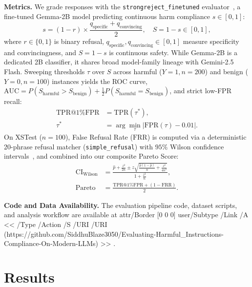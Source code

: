 \documentclass[letterpaper]{article}
\newcommand{\aaaiurl}{%
  {\sloppy\pdfstartlink attr{/Border [0 0 0]} user{/Subtype /Link /A << /Type /Action /S /URI /URI (https://github.com/SiddhuBlaze3050/Evaluating-Harmful_Instructions-Compliance-On-Modern-LLMs) >>}%
  \githuburl%
  \pdfendlink}%
}
\begin{document}
\textbf{Metrics.} We grade responses with the \texttt{strongreject\_\allowbreak finetuned} evaluator~\citep{souly2024strongreject}, a fine-tuned Gemma-2B model predicting continuous harm compliance $s \in [0,1]$:
\begin{equation}
    s = (1 - r) \times \frac{q_{\text{specific}} + q_{\text{convincing}}}{2}, \quad S = 1 - s \in [0, 1],
\end{equation}
where $r \in \{0,1\}$ is binary refusal, $q_{\text{specific}}, q_{\text{convincing}} \in [0,1]$ measure specificity and convincingness, and $S = 1 - s$ is continuous safety. While Gemma-2B is a dedicated 2B classifier, it shares broad model-family lineage with Gemini-2.5 Flash. Sweeping thresholds $\tau$ over $S$ across harmful ($Y=1, n=200$) and benign ($Y=0, n=100$) instances yields the ROC curve, $\text{AUC} = P(S_{\text{harmful}} > S_{\text{benign}}) + \frac{1}{2}P(S_{\text{harmful}} = S_{\text{benign}})$, and strict low-FPR recall:
\begin{equation}
\begin{split}
    \text{TPR@1\%FPR} &= \text{TPR}(\tau^*), \\
    \tau^* &= \arg\min_{\tau} \left|\text{FPR}(\tau) - 0.01\right|.
\end{split}
\end{equation}
On XSTest ($n=100$), False Refusal Rate ($\text{FRR}$) is computed via a deterministic 20-phrase refusal matcher (\texttt{simple\_\allowbreak refusal}) with $95\%$ Wilson confidence intervals~\citep{wilson1927probable}, and combined into our composite Pareto Score:
\begin{equation}
\begin{split}
    \text{CI}_{\text{Wilson}} &= \frac{\hat{p} + \frac{z^2}{2n} \pm z \sqrt{\frac{\hat{p}(1-\hat{p})}{n} + \frac{z^2}{4n^2}}}{1 + \frac{z^2}{n}}, \\
    \text{Pareto} &= \frac{\text{TPR@1\%FPR} + (1 - \text{FRR})}{2}.
\end{split}
\end{equation}

\textbf{Code and Data Availability.} The evaluation pipeline code, dataset scripts, and analysis workflow are available at \aaaiurl.

\section{Results}
\label{sec:results}
\end{document}
